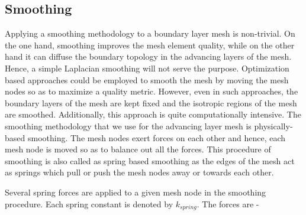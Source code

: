 \documentclass[conf]{new-aiaa}
\begin{document}
\subsection{Smoothing}

Applying a smoothing methodology to a boundary layer mesh is non-trivial. On the one hand, smoothing improves the mesh element quality, while on the other hand it can diffuse the boundary topology in the advancing layers of the mesh. Hence, a simple Laplacian smoothing will not serve the purpose. Optimization based approaches could be employed to smooth the mesh by moving the mesh nodes so as to maximize a quality metric\cite{canann1998approach}. However, even in such approaches, the boundary layers of the mesh are kept fixed and the isotropic regions of the mesh are smoothed. Additionally, this approach is quite computationally intensive. The smoothing methodology that we use for the advancing layer mesh is physically-based smoothing. The mesh nodes exert forces on each other and hence, each mesh node is moved so as to balance out all the forces. This procedure of smoothing is also called as spring based smoothing as the edges of the mesh act as springs which pull or push the mesh nodes away or towards each other.

Several spring forces are applied to a given mesh node in the smoothing procedure. Each spring constant is denoted by $k_{spring}$. The forces are -
\end{document}
